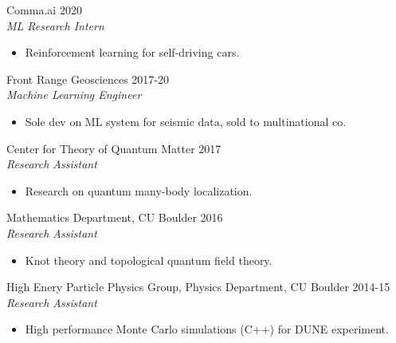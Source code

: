 \documentclass[margin]{res}
\begin{document}
\begin{resume}
                 Comma.ai \hfill            2020 \\
		{\sl ML Research Intern}
                 \begin{itemize}  \itemsep -2pt %
                 \item Reinforcement learning for self-driving cars.
                 \end{itemize}

               Front Range Geosciences \hfill            2017-20 \\
                 {\sl Machine Learning Engineer}
                 \begin{itemize}  \itemsep -2pt %
                 \item Sole dev on ML system for seismic data, sold to multinational co.
                 \end{itemize}
                 Center for Theory of Quantum Matter \hfill            2017 \\
		{\sl Research Assistant}
                 \begin{itemize}  \itemsep -2pt %
                 \item Research on quantum many-body localization.
                 \end{itemize}

                Mathematics Department, CU Boulder \hfill            2016 \\
		 {\sl Research Assistant}
                 \begin{itemize}  \itemsep -2pt %
                 \item Knot theory and topological quantum field theory.
                 \end{itemize}

                High Enery Particle Physics Group, Physics Department, CU Boulder  \hfill            2014-15 \\
		{\sl Research Assistant}
                 \begin{itemize}  \itemsep -2pt %
                 \item High performance Monte Carlo simulations (C++) for DUNE experiment.
                 \end{itemize}


\end{resume}
\end{document}
